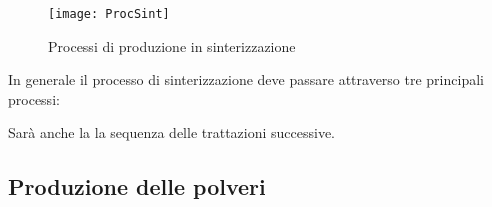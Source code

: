 \begin{figure}
\centering
\texttt{[image: ProcSint]}
\caption{Processi di produzione in sinterizzazione}
\label{fig:ProcSint}
\end{figure}

In generale il processo di sinterizzazione deve passare attraverso 
tre principali processi:

\begin{center}
\end{center}

Sarà anche la la sequenza delle trattazioni successive.

\subsection{Produzione delle polveri}
